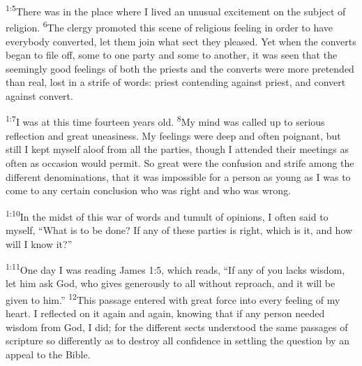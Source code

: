 \documentclass[openany,12pt,english]{book}
\newenvironment{para}{\par\pretolerance=100\tolerance=200\setlength{\emergencystretch}{0.6em}\relax}{\par}
\begin{document}
\begin{para}
    \textsuperscript{1:5}\thinspace{}There was in the place where I lived an un\-u\-su\-al ex\-cite\-ment on the sub\-ject of re\-li\-gion.
    \textsuperscript{6}\thinspace{}The cler\-gy pro\-mot\-ed this scene of re\-li\-gious feel\-ing in or\-der to have eve\-ry\-bod\-y con\-vert\-ed, let them join what sect they pleased. Yet when the converts be\-gan to file off, some to one par\-ty and some to an\-oth\-er, it was seen that the seemingly good feelings of both the priests and the converts were more pre\-tend\-ed than re\-al, lost in a strife of words: priest contending a\-gainst priest, and con\-vert a\-gainst con\-vert.
\end{para}

\begin{para}
    \textsuperscript{1:7}\thinspace{}I was at this time four\-teen years old.
    \textsuperscript{8}\thinspace{}My mind was called up to se\-ri\-ous re\-flec\-tion and great un\-eas\-i\-ness. My feelings were deep and of\-ten poign\-ant, but still I kept my\-self a\-loof from all the parties, though I attended their meetings as of\-ten as oc\-ca\-sion would per\-mit. So great were the con\-fu\-sion and strife a\-mong the dif\-fer\-ent denominations, that it was im\-pos\-si\-ble for a per\-son as young as I was to come to any cer\-tain con\-clu\-sion who was right and who was wrong.
\end{para}

\begin{para}
    \textsuperscript{1:10}\thinspace{}In the midst of this war of words and tu\-mult of opinions, I of\-ten said to my\-self, “What is to be done? If any of these parties is right, which is it, and how will I know it?”
\end{para}

\begin{para}
    \textsuperscript{1:11}\thinspace{}One day I was read\-ing James 1:5, which reads, “If any of you lacks wis\-dom, let him ask God, who gives gen\-er\-ous\-ly to all with\-out re\-proach, and it will be giv\-en to him.”
    \textsuperscript{12}\thinspace{}This pas\-sage entered with great force in\-to eve\-ry feel\-ing of my heart. I reflected on it a\-gain and a\-gain, know\-ing that if any per\-son needed wis\-dom from God, I did; for the dif\-fer\-ent sects un\-der\-stood the same passages of scrip\-ture so dif\-fer\-ent\-ly as to de\-stroy all con\-fi\-dence in set\-tling the ques\-tion by an ap\-peal to the Bible.
\end{para}
\end{document}

